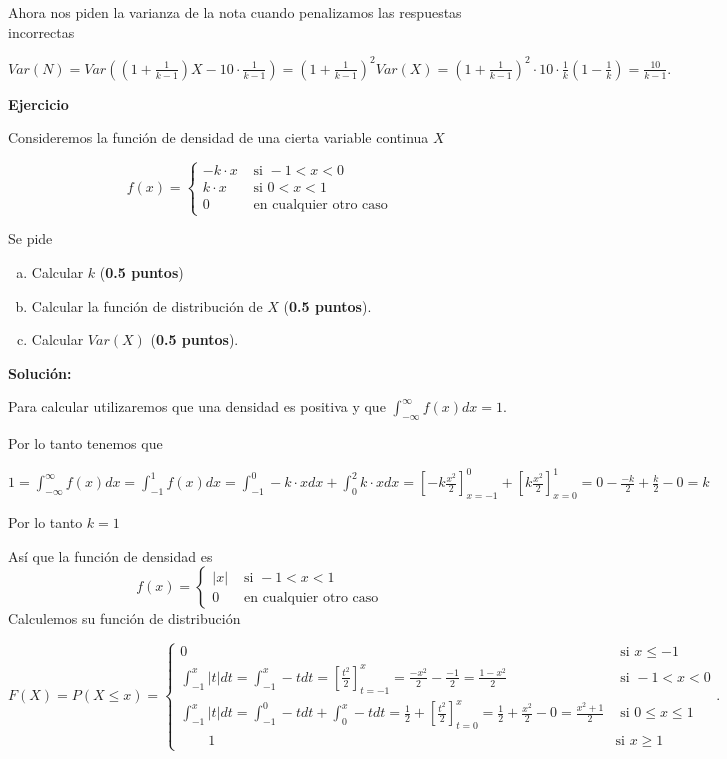 \documentclass[12pt,spanish,es-nodecimaldot]{article}\usepackage[]{graphicx}\usepackage[]{color}
\newcounter{problemes}
\newcounter{punts} \def\thepunts{\arabic{punts}}
\def\probl{\textbf{\newline\noindent\hspace{-1cm} Ejercicio}\addtocounter{problemes}{1} \setcounter{punts}{0}
\medskip\noindent{\bf \theproblemes) }}
\newif\ifsol
\begin{document}
Ahora nos piden la varianza de la nota cuando penalizamos las respuestas incorrectas

$Var(N)=Var\left(\left(1+\frac{1}{k-1}\right) X-10\cdot\frac{1}{k-1}\right)=\left(1+\frac{1}{k-1}\right)^2 Var(X)=
\left(1+\frac{1}{k-1}\right)^2\cdot 10\cdot \frac{1}{k} \left(1-\frac{1}{k}\right)=\frac{10}{k-1}.$



\fi
\vspace{2cm}

\probl Consideremos la función de densidad de una cierta variable continua $X$

$$f(x)=\left\{
\begin{array}{cr}
-k\cdot x & \mbox{ si } -1<x<0\\
k\cdot x & \mbox{ si }  0<x<1\\
0 & \mbox{ en cualquier otro caso}
\end{array}
\right.
$$

Se pide

\begin{enumerate}[a)]
\item Calcular $k$ (\textbf{0.5 puntos})
\item Calcular la función de  distribución de $X$ (\textbf{0.5 puntos}).
\item Calcular $Var(X)$ (\textbf{0.5 puntos}).
\end{enumerate}

\ifsol
\textbf{Solución:}

Para calcular  utilizaremos que una densidad es positiva y que 
$\int_{-\infty}^{\infty} f(x) dx=1$.

Por lo tanto tenemos que 

$1=\int_{-\infty}^{\infty} f(x) dx=\int_{-1}^{1} f(x) dx=
\int_{-1}^{0} -k \cdot x dx+\int_{0}^{2} k \cdot x dx=
\left[-k\frac{x^2}{2}\right]_{x=-1}^0+\left[k\frac{x^2}{2}\right]_{x=0}^1=
0- \frac{-k}{2}+ \frac{k}{2}-0=k$

Por lo tanto $k=1$

Así que la función de densidad es 
$$f(x)=\left\{
\begin{array}{cr}
|x| & \mbox{ si }  -1<x<1\\
0 & \mbox{ en cualquier otro caso}
\end{array}
\right.
$$
Calculemos su función de distribución



$$F(X)=P(X\leq x)=\left\{
\begin{array}{lr}
0 & \mbox{ si }  x\leq -1\\
\int_{-1}^x |t| dt=\int_{-1}^x -t dt=\left[\frac{t^2}{2}\right]_{t=-1}^x= \frac{-x^2}{2}-\frac{-1}{2}=\frac{1-x^2}{2}   & \mbox{ si }  -1< x <0\\
\int_{-1}^x |t| dt=\int_{-1}^{0} -t dt +\int_{0}^x -t dt=\frac{1}{2}+\left[\frac{t^2}{2}\right]_{t=0}^x= \frac{1}{2}+\frac{x^2}{2}-0=\frac{x^2+1}{2}   & \mbox{ si }  0\leq x\leq 1\\
\qquad 1 & \mbox{si } x \geq 1
\end{array}
\right.
.$$
\end{document}
